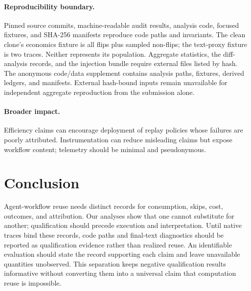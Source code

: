 \documentclass[letterpaper]{article} %
\begin{document}
\paragraph{Reproducibility boundary.}
Pinned source commits, machine-readable audit results, analysis code, focused
fixtures, and SHA-256 manifests reproduce code paths and invariants. The clean
clone's economics fixture is all flips plus sampled non-flips; the text-proxy
fixture is two traces. Neither represents its population. Aggregate statistics,
the diff-analysis records, and the injection bundle require external files
listed by hash. The anonymous code/data supplement contains analysis paths,
fixtures, derived ledgers, and manifests. External hash-bound inputs remain
unavailable for independent aggregate reproduction from the submission alone.

\paragraph{Broader impact.}
Efficiency claims can encourage deployment of replay policies whose failures
are poorly attributed. Instrumentation can reduce misleading claims but expose
workflow content; telemetry should be minimal and pseudonymous.

\section{Conclusion}

Agent-workflow reuse needs distinct records for consumption, skips, cost,
outcomes, and attribution. Our analyses show that one cannot substitute for
another; qualification should precede execution and interpretation. Until
native traces bind these records, code paths and final-text diagnostics should
be reported as qualification evidence rather than realized reuse.
An identifiable evaluation should state the record supporting each claim and
leave unavailable quantities unobserved. This separation keeps negative
qualification results informative without converting them into a universal
claim that computation reuse is impossible.


\end{document}
